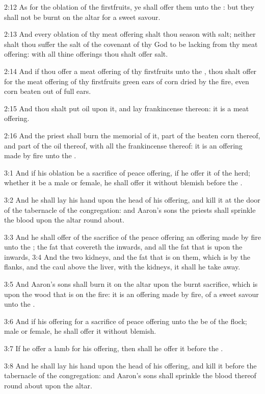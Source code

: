 2:12 As for the oblation of the firstfruits, ye shall offer them unto the \LORD: but they shall not be burnt on the altar for a sweet savour.

2:13 And every oblation of thy meat offering shalt thou season with salt; neither shalt thou suffer the salt of the covenant of thy God to be lacking from thy meat offering: with all thine offerings thou shalt offer salt.

2:14 And if thou offer a meat offering of thy firstfruits unto the \LORD, thou shalt offer for the meat offering of thy firstfruits green ears of corn dried by the fire, even corn beaten out of full ears.

2:15 And thou shalt put oil upon it, and lay frankincense thereon: it is a meat offering.

2:16 And the priest shall burn the memorial of it, part of the beaten corn thereof, and part of the oil thereof, with all the frankincense thereof: it is an offering made by fire unto the \LORD.

3:1 And if his oblation be a sacrifice of peace offering, if he offer it of the herd; whether it be a male or female, he shall offer it without blemish before the \LORD.

3:2 And he shall lay his hand upon the head of his offering, and kill it at the door of the tabernacle of the congregation: and Aaron's sons the priests shall sprinkle the blood upon the altar round about.

3:3 And he shall offer of the sacrifice of the peace offering an offering made by fire unto the \LORD; the fat that covereth the inwards, and all the fat that is upon the inwards, 3:4 And the two kidneys, and the fat that is on them, which is by the flanks, and the caul above the liver, with the kidneys, it shall he take away.

3:5 And Aaron's sons shall burn it on the altar upon the burnt sacrifice, which is upon the wood that is on the fire: it is an offering made by fire, of a sweet savour unto the \LORD.

3:6 And if his offering for a sacrifice of peace offering unto the \LORD be of the flock; male or female, he shall offer it without blemish.

3:7 If he offer a lamb for his offering, then shall he offer it before the \LORD.

3:8 And he shall lay his hand upon the head of his offering, and kill it before the tabernacle of the congregation: and Aaron's sons shall sprinkle the blood thereof round about upon the altar.

